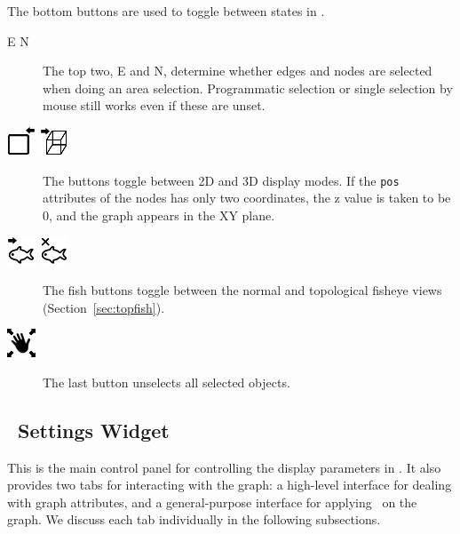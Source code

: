 The bottom buttons are used to toggle between states in \smyrna.
\begin{description}
\item[E  N]
The top two, E and N, determine whether edges and nodes are selected when doing
an area selection. Programmatic selection or single selection by mouse still works even
if these are unset.
\item[\includegraphics{figures/2D.png} \includegraphics{figures/3D.png}]
The buttons toggle between 2D and 3D display modes. 
If the {\tt pos} attributes of the nodes has only two coordinates, the
z value is taken to be 0, and the graph appears in the XY plane.
\item[\includegraphics{figures/fisheye.png} \includegraphics{figures/no_fisheye.png}]
The fish buttons toggle between the normal and topological fisheye views (Section~\ref{sec:topfish}).
\item[\includegraphics{figures/pan.png}]
The last button unselects all selected objects. 

\end{description}

\subsection{\smyrna\ Settings Widget}
\label{sec:settings}
This is the main control panel for controlling the display parameters in
\smyrna. It also provides two tabs for interacting with the graph: a high-level
interface for dealing with graph attributes, and a general-purpose interface
for applying \gvpr\ on the graph. We discuss each tab individually in
the following subsections.

